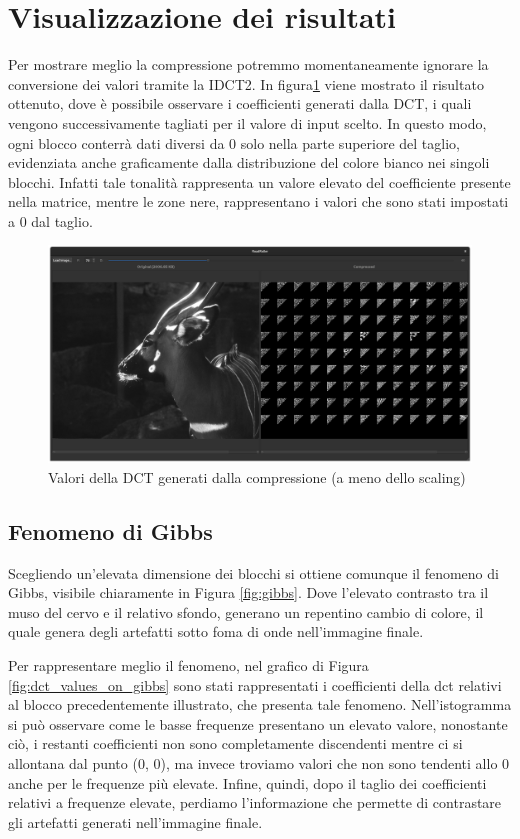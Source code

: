 \section{Visualizzazione dei risultati}

Per mostrare meglio la compressione potremmo momentaneamente ignorare la conversione dei valori tramite la IDCT2. In figura\ref{fig:compression_values} viene mostrato il risultato ottenuto, dove è possibile osservare i coefficienti generati dalla DCT, i quali vengono successivamente tagliati per il valore di input scelto. In questo modo, ogni blocco conterrà dati diversi da 0 solo nella parte superiore del taglio, evidenziata anche graficamente dalla distribuzione del colore bianco nei singoli blocchi. Infatti tale tonalità rappresenta un valore elevato del coefficiente presente nella matrice, mentre le zone nere, rappresentano i valori che sono stati impostati a 0 dal taglio.

\begin{figure}[h]
	\centering
	\includegraphics[width=1\linewidth]{figures/qt_dct_values}
	\caption{Valori della DCT generati dalla compressione (a meno dello scaling)}
	\label{fig:compression_values}
\end{figure}

\subsection{Fenomeno di Gibbs}

Scegliendo un'elevata dimensione dei blocchi si ottiene comunque il fenomeno di Gibbs, visibile chiaramente in Figura \ref{fig:gibbs}. Dove l'elevato contrasto tra il muso del cervo e il relativo sfondo, generano un repentino cambio di colore, il quale genera degli artefatti sotto foma di onde nell'immagine finale.

Per rappresentare meglio il fenomeno, nel grafico di Figura \ref{fig:dct_values_on_gibbs} sono stati rappresentati i coefficienti della dct relativi al blocco precedentemente illustrato, che presenta tale fenomeno. Nell'istogramma si può osservare come le basse frequenze presentano un elevato valore, nonostante ciò, i restanti coefficienti non sono completamente discendenti mentre ci si allontana dal punto (0, 0), ma invece troviamo valori che non sono tendenti allo 0 anche per le frequenze più elevate. Infine, quindi, dopo il taglio dei coefficienti relativi a frequenze elevate, perdiamo l'informazione che permette di contrastare gli artefatti generati nell'immagine finale.

